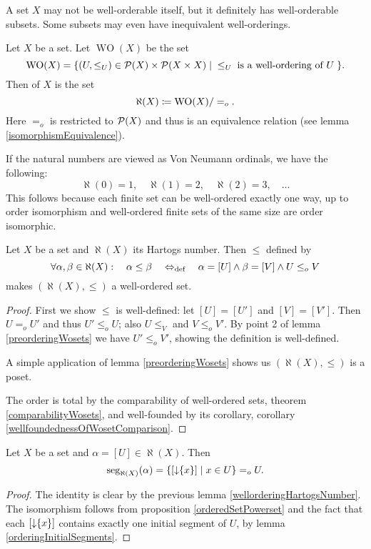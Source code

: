 A set $X$ may not be well-orderable itself, but it definitely has well-orderable subsets. Some subsets may even have inequivalent well-orderings.
\begin{definition}
Let $X$ be a set. Let $\operatorname{WO}(X)$ be the set
\[ \operatorname{WO}(X) = \{ (U,\leq_U) \in \operatorname{\mathcal{P}}(X)\times\operatorname{\mathcal{P}}(X\times X) \;|\; \leq_U\; \text{is a well-ordering of $U$}\;  \}. \]
Then  of $X$ is the set
\[ \aleph(X) \coloneqq \operatorname{WO}(X)/=_o. \]
Here $=_o$ is restricted to $\operatorname{\mathcal{P}}(X)$ and thus is an equivalence relation (see lemma \ref{isomorphismEquivalence}).
\end{definition}
If the natural numbers are viewed as Von Neumann ordinals, we have the following:
\[ \aleph(0) = 1, \quad \aleph(1) = 2, \quad \aleph(2) = 3, \quad \ldots \]
This follows because each finite set can be well-ordered exactly one way, up to order isomorphism and well-ordered finite sets of the same size are order isomorphic.

\begin{lemma} \label{wellorderingHartogsNumber}
Let $X$ be a set and $\aleph(X)$ its Hartogs number. Then $\leq$ defined by
\[ \forall \alpha, \beta \in \aleph(X):\quad \alpha \leq \beta \quad\Leftrightarrow_{\text{def}}\quad \alpha = [U] \land \beta = [V] \land U\leq_o V \]
makes $(\aleph(X), \leq)$ a well-ordered set.
\end{lemma}
\begin{proof}
First we show $\leq$ is well-defined: let $[U] = [U']$ and $[V] = [V']$. Then $U =_o U'$ and thus $U'\leq_o U$; also $U \leq_V$ and $V\leq_o V'$. By point 2 of lemma \ref{preorderingWosets} we have $U' \leq_o V'$, showing the definition is well-defined.

A simple application of lemma \ref{preorderingWosets} shows us $(\aleph(X), \leq)$ is a poset.

The order is total by the comparability of well-ordered sets, theorem \ref{comparabilityWosets}, and well-founded by its corollary, corollary \ref{wellfoundednessOfWosetComparison}.
\end{proof}

\begin{lemma} \label{HartogsNumberAsOrdinal}
Let $X$ be a set and $\alpha = [U] \in \aleph(X)$. Then
\[ \operatorname{seg}_{\aleph(X)}(\alpha) = \{ [\operatorname{\downarrow}\{x\}] \;|\; x\in U \} =_o U. \]
\end{lemma}
\begin{proof}
The identity is clear by the previous lemma \ref{wellorderingHartogsNumber}. The isomorphism follows from proposition \ref{orderedSetPowerset} and the fact that each $[\operatorname{\downarrow}\{x\}]$ contains exactly one initial segment of $U$, by lemma \ref{orderingInitialSegments}.
\end{proof}

